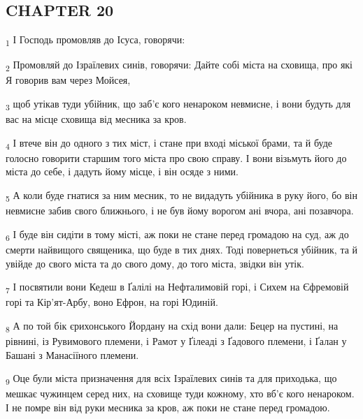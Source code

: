 \subsection{CHAPTER 20}
\begin{tcolorbox}
\textsubscript{1} І Господь промовляв до Ісуса, говорячи:
\end{tcolorbox}
\begin{tcolorbox}
\textsubscript{2} Промовляй до Ізраїлевих синів, говорячи: Дайте собі міста на сховища, про які Я говорив вам через Мойсея,
\end{tcolorbox}
\begin{tcolorbox}
\textsubscript{3} щоб утікав туди убійник, що заб'є кого ненароком невмисне, і вони будуть для вас на місце сховища від месника за кров.
\end{tcolorbox}
\begin{tcolorbox}
\textsubscript{4} І втече він до одного з тих міст, і стане при вході міської брами, та й буде голосно говорити старшим того міста про свою справу. І вони візьмуть його до міста до себе, і дадуть йому місце, і він осяде з ними.
\end{tcolorbox}
\begin{tcolorbox}
\textsubscript{5} А коли буде гнатися за ним месник, то не видадуть убійника в руку його, бо він невмисне забив свого ближнього, і не був йому ворогом ані вчора, ані позавчора.
\end{tcolorbox}
\begin{tcolorbox}
\textsubscript{6} І буде він сидіти в тому місті, аж поки не стане перед громадою на суд, аж до смерти найвищого священика, що буде в тих днях. Тоді повернеться убійник, та й увійде до свого міста та до свого дому, до того міста, звідки він утік.
\end{tcolorbox}
\begin{tcolorbox}
\textsubscript{7} І посвятили вони Кедеш в Ґалілі на Нефталимовій горі, і Сихем на Єфремовій горі та Кір'ят-Арбу, воно Ефрон, на горі Юдиній.
\end{tcolorbox}
\begin{tcolorbox}
\textsubscript{8} А по той бік єрихонського Йордану на схід вони дали: Бецер на пустині, на рівнині, із Рувимового племени, і Рамот у Ґілеаді з Ґадового племени, і Ґалан у Башані з Манасіїного племени.
\end{tcolorbox}
\begin{tcolorbox}
\textsubscript{9} Оце були міста призначення для всіх Ізраїлевих синів та для приходька, що мешкає чужинцем серед них, на сховище туди кожному, хто вб'є кого ненароком. І не помре він від руки месника за кров, аж поки не стане перед громадою.
\end{tcolorbox}
